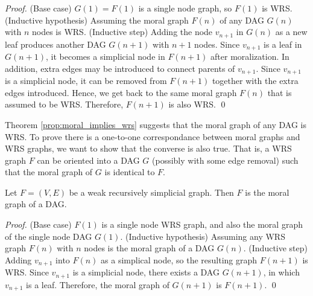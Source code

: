\begin{proof}
(Base case) $G(1) = F(1)$ is a single node graph, so $F(1)$ is WRS. (Inductive hypothesis) Assuming the moral graph $F(n)$ of any DAG $G(n)$ with $n$ nodes is WRS. (Inductive step) Adding the node $v_{n+1}$ in $G(n)$ as a new leaf produces another DAG $G(n+1)$ with $n+1$ nodes. Since $v_{n+1}$ is a leaf in $G(n+1)$, it becomes a simplicial node in $F(n+1)$ after moralization. In addition, extra edges may be introduced to connect parents of $v_{n+1}$. Since $v_{n+1}$ is a simplicial node, it can be removed from $F(n+1)$ together with the extra edges introduced. Hence, we get back to the same moral graph $F(n)$ that is assumed to be WRS. Therefore, $F(n+1)$ is also WRS. \qed
\end{proof}
Theorem \ref{prop:moral_implies_wrs} suggests that the moral graph of any DAG is WRS. To prove there is a one-to-one correspondance between moral graphs and WRS graphs, we want to show that the converse is also true. That is, a WRS graph $F$ can be oriented into a DAG $G$ (possibly with some edge removal) such that the moral graph of $G$ is identical to $F$. 

\begin{theorem}
\label{prop:wrs_implies_moral}
Let $F=(V,E)$ be a weak recursively simplicial graph. Then $F$ is the moral graph of a DAG. 
\end{theorem}

\begin{proof}
(Base case) $F(1)$ is a single node WRS graph, and also the moral graph of the single node DAG $G(1)$. (Inductive hypothesis) Assuming any WRS graph $F(n)$ with $n$ nodes is the moral graph of a DAG $G(n)$. (Inductive step) Adding $v_{n+1}$ into $F(n)$ as a simplical node, so the resulting graph $F(n+1)$ is WRS. Since $v_{n+1}$ is a simplicial node, there exists a DAG $G(n+1)$, in which $v_{n+1}$ is a leaf. Therefore, the moral graph of $G(n+1)$ is $F(n+1)$. \qed

\end{proof}

